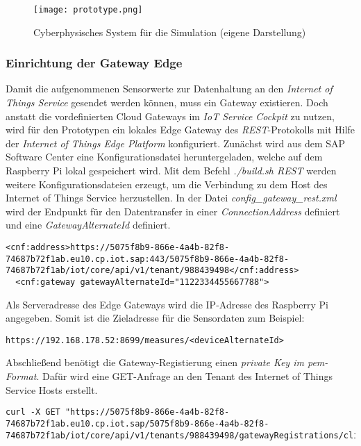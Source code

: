 \begin{figure}[H]
  \centering
  \texttt{[image: prototype.png]}
  \caption[Cyberphysisches System für die Simulation]{Cyberphysisches System für die Simulation (eigene Darstellung)}
  \label{raspi}
\end{figure}


\subsubsection{Einrichtung der Gateway Edge}

Damit die aufgenommenen Sensorwerte zur Datenhaltung an den \textit{Internet of Things Service} gesendet werden können, muss ein Gateway existieren. Doch anstatt die vordefinierten Cloud Gateways im \textit{IoT Service Cockpit} zu nutzen, wird für den Prototypen ein lokales Edge Gateway des \textit{REST}-Protokolls mit Hilfe der \textit{Internet of Things Edge Platform} konfiguriert. Zunächst wird aus dem SAP Software Center eine Konfigurationsdatei heruntergeladen, welche auf dem Raspberry Pi lokal gespeichert wird. Mit dem Befehl \textit{./build.sh REST} werden weitere Konfigurationsdateien erzeugt, um die Verbindung zu dem Host des Internet of Things Service herzustellen. In der Datei \textit{config\_gateway\_rest.xml} wird der Endpunkt für den Datentransfer in einer \textit{ConnectionAddress} definiert und eine \textit{GatewayAlternateId} definiert.

\begin{lstlisting}[caption= Gateway-Verbindung zur Cloud]
  <cnf:address>https://5075f8b9-866e-4a4b-82f8-74687b72f1ab.eu10.cp.iot.sap:443/5075f8b9-866e-4a4b-82f8-74687b72f1ab/iot/core/api/v1/tenant/988439498</cnf:address>
  <cnf:gateway gatewayAlternateId="1122334455667788">
\end{lstlisting}
Als Serveradresse des Edge Gateways wird die IP-Adresse des Raspberry Pi angegeben. Somit ist die Zieladresse für die Sensordaten zum Beispiel:

\begin{lstlisting}[caption= Zieladresse für Sensorwerte]
  https://192.168.178.52:8699/measures/<deviceAlternateId>\end{lstlisting}

\noindent Abschließend benötigt die Gateway-Registierung einen \textit{private Key im pem-Format}. Dafür wird eine GET-Anfrage an den Tenant des Internet of Things Service Hosts erstellt.

\begin{lstlisting}[caption= GET-Anfrage für einen Client-Key]
curl -X GET "https://5075f8b9-866e-4a4b-82f8-74687b72f1ab.eu10.cp.iot.sap/5075f8b9-866e-4a4b-82f8-74687b72f1ab/iot/core/api/v1/tenants/988439498/gatewayRegistrations/clientCertificate/pem\end{lstlisting}

